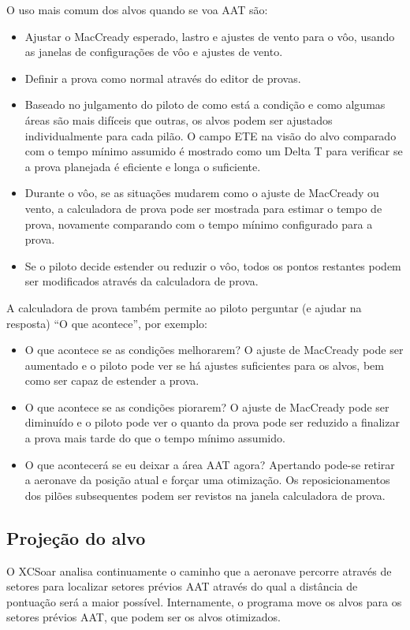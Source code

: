 O uso mais comum dos alvos quando se voa AAT são:
\begin{itemize}
\item Ajustar o MacCready esperado, lastro e ajustes de vento para o vôo, usando as janelas de configurações de vôo e ajustes de vento.
\item Definir a prova como normal através do editor de provas.
\item Baseado no julgamento do piloto de como está a condição e como algumas áreas são mais difíceis que outras, os alvos podem ser ajustados individualmente para cada pilão.  O campo ETE na visão do alvo comparado com o tempo mínimo assumido é mostrado como um Delta T para verificar se a prova planejada é eficiente e longa o suficiente.
\item Durante o vôo, se as situações mudarem como o ajuste de MacCready ou vento, a calculadora de prova pode ser mostrada para estimar o tempo de prova, novamente comparando com o tempo mínimo configurado para a prova.
\item Se o piloto decide estender ou reduzir o vôo, todos os pontos restantes podem ser modificados através da calculadora de prova.
\end{itemize}

A calculadora de prova também permite ao piloto perguntar (e ajudar na resposta) “O que acontece”, por exemplo: 
\begin{itemize}
\item O que acontece se as condições melhorarem? O ajuste de MacCready pode ser aumentado e o piloto pode ver se há ajustes suficientes para os alvos, bem como ser capaz de estender a prova.
\item O que acontece se as condições piorarem? O ajuste de MacCready pode ser diminuído e o piloto pode ver o quanto da prova pode ser reduzido a finalizar a prova mais tarde do que o tempo mínimo assumido.
\item O que acontecerá se eu deixar a área AAT agora?  Apertando   pode-se retirar a aeronave da posição atual e forçar uma otimização.  Os reposicionamentos dos pilões subsequentes podem ser revistos na janela calculadora de prova.
\end{itemize}

\subsection*{Projeção do alvo}

O XCSoar analisa continuamente o caminho que a aeronave percorre através de setores para localizar setores prévios AAT através do qual a distância de pontuação será a maior possível.  Internamente, o programa move os alvos para os setores prévios AAT, que podem ser os alvos otimizados.

